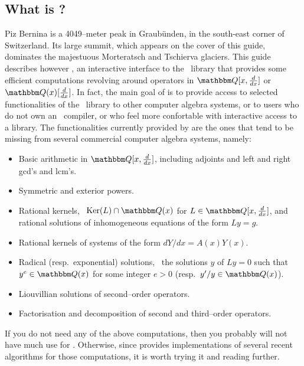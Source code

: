 \subsection{What is \bernina?}
Piz Bernina is a 4049--meter peak in Graub\"unden, in
the south-east corner of Switzerland. Its large summit, which
appears on the cover of this guide,
dominates the majestuous Morteratsch and Tschierva glaciers.
This guide describes however \bernina, an interactive interface to
the \sumit~library that provides some efficient computations revolving
around operators in $\weyl$ or $\weylq$. In fact, the
main goal of \bernina{} is to provide access to selected functionalities
of the \sumit~library to other computer algebra systems, or to users
who do not own an \asharp~compiler, or who feel more confortable with
interactive access to a library. The functionalities currently provided
by \bernina{} are the ones that tend to be missing from several commercial
computer algebra systems, namely:
\begin{itemize}
\item
Basic arithmetic in $\weyl$, including
adjoints and left and right gcd's and lcm's.
\item
Symmetric and exterior powers.
\item
Rational kernels, \ie~$\Ker(L) \cap \QQ(x)$ for $L \in \weyl$,
and rational solutions of inhomogeneous equations of the form
$L y = g$. %
\item
Rational kernels of systems of the form $dY/dx = A(x) Y(x)$.
\item
Radical (resp.~exponential) solutions, \ie~the solutions $y$ of $L y = 0$
such that $y^e \in \QQ(x)$ for some integer $e > 0$
(resp.~$y'/y \in \QQ(x)$).
\item
Liouvillian solutions of second--order operators.
\item
Factorisation and decomposition of second and third--order operators.
\end{itemize}
If you do not need any of the above computations, then
you probably will not have much use for \bernina.
Otherwise, since \bernina{} provides implementations of several recent
algorithms for those computations, it is worth trying it and
reading further.

